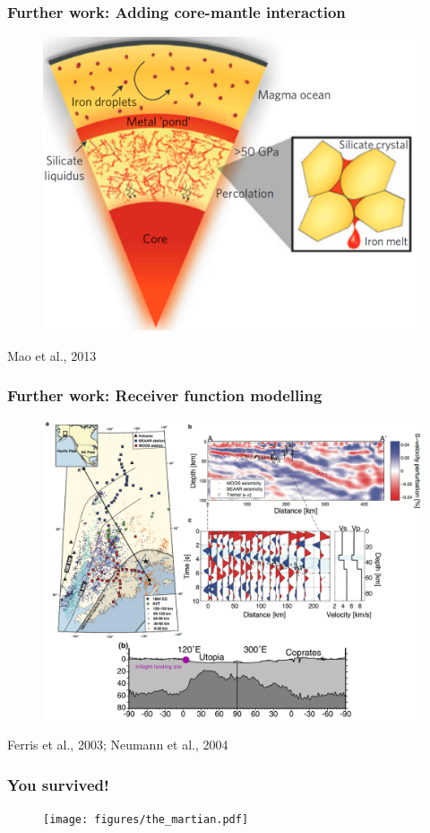\documentclass[compress,framenumber]{beamer}
\begin{document}
\begin{frame}
  \frametitle{Further work: Adding core-mantle interaction}
  \vspace{-2.0em}
  \begin{figure}
    \includegraphics[width=0.75\linewidth]{figures/differentiation.pdf}
  \end{figure}
  \vspace{-2.0em}
  \hfill Mao et al., 2013
\end{frame}


\begin{frame}
  \frametitle{Further work: Receiver function modelling}
  \vspace{-2.0em}
  \begin{figure}
    \includegraphics[width=0.65\linewidth]{figures/r_fn.pdf}
  \end{figure}
  \hfill Ferris et al., 2003; Neumann et al., 2004 
\end{frame}

\begin{frame}
  \frametitle{You survived!}
  \vspace{-2.0em}
  \begin{figure}
    \texttt{[image: figures/the\_martian.pdf]} 
  \end{figure}
\end{frame}
\end{document}
